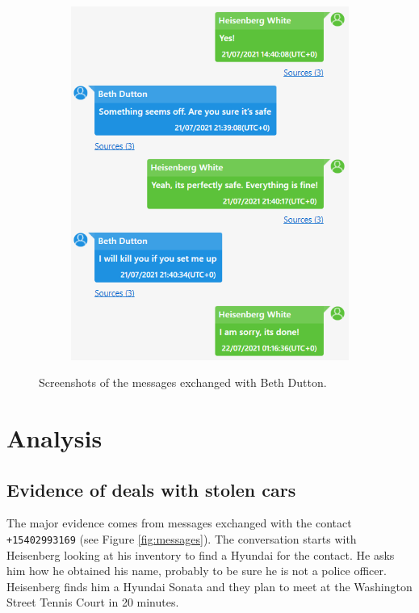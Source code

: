 \documentclass[12pt]{article}
\begin{document}
\begin{figure}[!ht]
\begin{subfigure}[b]{0.3\textwidth}
        \includegraphics[width=\textwidth]{images/beth2.png}
        \caption{}
    \end{subfigure}
    \caption{Screenshots of the messages exchanged with Beth Dutton.}
    \label{fig:messages2}
\end{figure}


\section{Analysis}

\subsection{Evidence of deals with stolen cars}

The major evidence comes from messages exchanged with the contact \texttt{+15402993169} (see Figure \ref{fig:messages}).
The conversation starts with Heisenberg looking at his inventory to find a Hyundai for the contact. He asks him how he obtained his name, probably to be sure he is not a police officer. Heisenberg finds him a Hyundai Sonata and they plan to meet at the Washington Street Tennis Court in 20 minutes.
\end{document}
